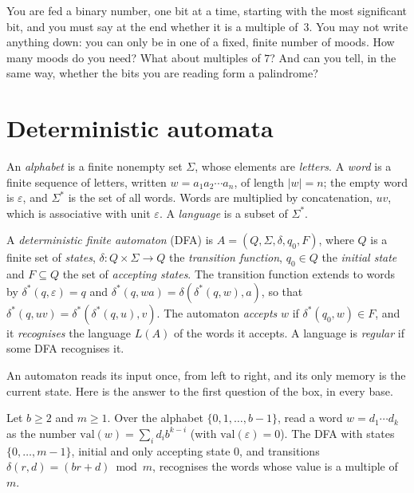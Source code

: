 \begin{think}
You are fed a binary number, one bit at a time, starting with the most significant bit, and you must say at the end whether it is a multiple of~$3$. You may not write anything down: you can only be in one of a fixed, finite number of moods. How many moods do you need? What about multiples of $7$? And can you tell, in the same way, whether the bits you are reading form a palindrome?
\end{think}

\section{Deterministic automata}\label{sec:dfa}

An \emph{alphabet} is a finite nonempty set $\Sigma$, whose elements are \emph{letters}. A \emph{word} is a finite sequence of letters, written $w=a_1a_2\cdots a_n$, of length $|w|=n$; the empty word is $\varepsilon$, and $\Sigma^*$ is the set of all words. Words are multiplied by concatenation, $uv$, which is associative with unit $\varepsilon$. A \emph{language} is a subset of $\Sigma^*$.

\begin{definition}\label{def:dfa}
A \emph{deterministic finite automaton} (DFA) is $A=(Q,\Sigma,\delta,q_0,F)$, where $Q$ is a finite set of \emph{states}, $\delta:Q\times\Sigma\to Q$ the \emph{transition function}, $q_0\in Q$ the \emph{initial state} and $F\subseteq Q$ the set of \emph{accepting states}. The transition function extends to words by $\delta^*(q,\varepsilon)=q$ and $\delta^*(q,wa)=\delta(\delta^*(q,w),a)$, so that $\delta^*(q,uv)=\delta^*(\delta^*(q,u),v)$. The automaton \emph{accepts} $w$ if $\delta^*(q_0,w)\in F$, and it \emph{recognises} the language $L(A)$ of the words it accepts. A language is \emph{regular} if some DFA recognises it.
\end{definition}

An automaton reads its input once, from left to right, and its only memory is the current state. Here is the answer to the first question of the box, in every base.

\begin{proposition}\label{prop:multiples}
Let $b\ge2$ and $m\ge1$. Over the alphabet $\{0,1,\dots,b-1\}$, read a word $w=d_1\cdots d_k$ as the number $\mathrm{val}(w)=\sum_id_ib^{k-i}$ (with $\mathrm{val}(\varepsilon)=0$). The DFA with states $\{0,\dots,m-1\}$, initial and only accepting state $0$, and transitions $\delta(r,d)=(br+d)\bmod m$, recognises the words whose value is a multiple of $m$.
\end{proposition}

